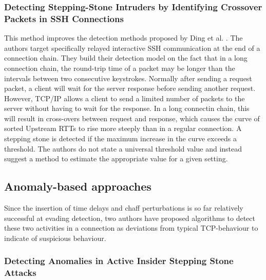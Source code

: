 \documentclass[conference]{IEEEtran}\usepackage[]{graphicx}\usepackage[]{color}
\begin{document}
\subsubsection{Detecting Stepping-Stone Intruders by Identifying Crossover Packets in SSH Connections \cite{huang2016detecting}}

This method improves the detection methods proposed by Ding et al. \cite{ding2009detecting}. The authors target specifically relayed interactive SSH communication at the end of a connection chain. They build their detection model on the fact that in a long connection chain, the round-trip time of a packet may be longer than the intervals between two consecutive keystrokes. Normally after sending a request packet, a client will wait for the server response before sending another request. However, TCP/IP allows a client to send a limited number of packets to the server without having to wait for the response. In a long connectin chain, this will result in cross-overs between request and response, which causes the curve of sorted Upstream RTTs to rise more steeply than in a regular connection. A stepping stone is detected if the maximum increase in the curve exceeds a threshold. The authors do not state a universal threshold value and instead suggest a method to estimate the appropriate value for a given setting.






\subsection{Anomaly-based approaches}

Since the insertion of time delays and chaff perturbations is so far relatively successful at evading detection, two authors have proposed algorithms to detect these two activities in a connection as deviations from typical TCP-behaviour to indicate of suspicious behaviour. 

\subsubsection{Detecting Anomalies in Active Insider Stepping Stone Attacks}
\end{document}
